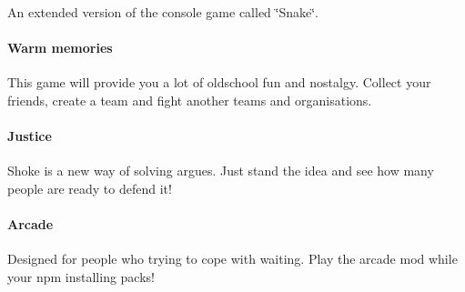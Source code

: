 An extended version of the console game called \char`\"{}\-Snake\char`\"{}. \paragraph*{Warm memories}

This game will provide you a lot of oldschool fun and nostalgy. Collect your friends, create a team and fight another teams and organisations. \paragraph*{Justice}

Shoke is a new way of solving argues. Just stand the idea and see how many people are ready to defend it! \paragraph*{Arcade}

Designed for people who trying to cope with waiting. Play the arcade mod while your npm installing packs! 